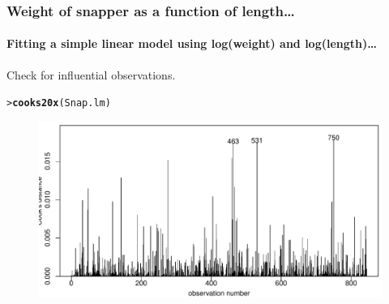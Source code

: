 \documentclass{beamer}\usepackage[]{graphicx}\usepackage[]{xcolor}
\makeatletter
\newcommand{\hlstd}[1]{\textcolor[rgb]{0.345,0.345,0.345}{#1}}%
\newcommand{\hlkwd}[1]{\textcolor[rgb]{0.737,0.353,0.396}{\textbf{#1}}}%
\newenvironment{kframe}{%
 \def\at@end@of@kframe{}%
 \ifinner\ifhmode%
  \def\at@end@of@kframe{\end{minipage}}%
  \begin{minipage}{\columnwidth}%
 \fi\fi%
 \def\FrameCommand##1{\hskip\@totalleftmargin \hskip-\fboxsep
 \colorbox{shadecolor}{##1}\hskip-\fboxsep
     \hskip-\linewidth \hskip-\@totalleftmargin \hskip\columnwidth}%
 \MakeFramed {\advance\hsize-\width
   \@totalleftmargin\z@ \linewidth\hsize
   \@setminipage}}%
 {\par\unskip\endMakeFramed%
 \at@end@of@kframe}
\newenvironment{knitrout}{}{} %
\makeatother
\begin{document}
\begin{frame}[fragile]
\frametitle{Weight of snapper as a function of length\ldots}
\framesubtitle{Fitting a simple linear model using log(weight) and log(length)\ldots}

Check for influential observations.
\begin{knitrout}\scriptsize
{}\color{fgcolor}\begin{kframe}
\begin{alltt}
\hlstd{> }\hlkwd{cooks20x}\hlstd{(Snap.lm)}
\end{alltt}
\end{kframe}
\end{knitrout}



\begin{figure}
  \centering
  \includegraphics[scale=0.5]{figure/RC-H07-010}
\end{figure}

\end{frame}
\end{document}

